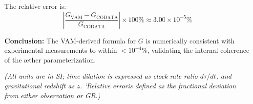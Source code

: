 The relative error is:
\[
\left| \frac{G_\text{VAM} - G_\text{CODATA}}{G_\text{CODATA}} \right| \times 100\% \approx 3.00 \times 10^{-5}\%
\]

\noindent
\textbf{Conclusion:} The VAM-derived formula for \( G \) is numerically consistent with experimental measurements to within \( < 10^{-4}\% \), validating the internal coherence of the æther parameterization.

\textit{(All units are in SI; time dilation is expressed as clock rate ratio $d\tau/dt$, and gravitational redshift as $z$. ‘Relative error\rqs  is defined as the fractional deviation from either observation or GR.)}


